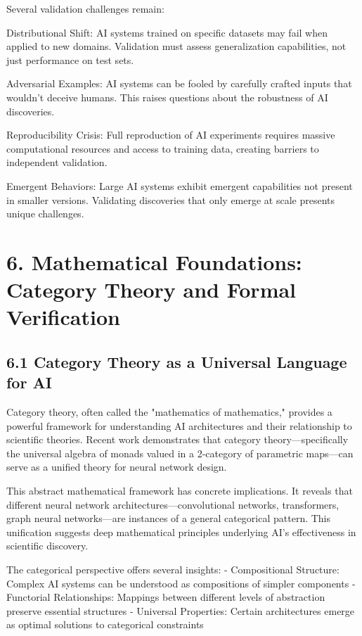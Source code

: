 \documentclass{article}
\begin{document}
Several validation challenges remain:


Distributional Shift: AI systems trained on specific datasets may fail when applied to new domains. Validation must assess generalization capabilities, not just performance on test sets.


Adversarial Examples: AI systems can be fooled by carefully crafted inputs that wouldn't deceive humans. This raises questions about the robustness of AI discoveries.


Reproducibility Crisis: Full reproduction of AI experiments requires massive computational resources and access to training data, creating barriers to independent validation.


Emergent Behaviors: Large AI systems exhibit emergent capabilities not present in smaller versions. Validating discoveries that only emerge at scale presents unique challenges.


\section{6. Mathematical Foundations: Category Theory and Formal Verification}

\subsection{6.1 Category Theory as a Universal Language for AI}

Category theory, often called the "mathematics of mathematics," provides a powerful framework for understanding AI architectures and their relationship to scientific theories. Recent work demonstrates that category theory—specifically the universal algebra of monads valued in a 2-category of parametric maps—can serve as a unified theory for neural network design.


This abstract mathematical framework has concrete implications. It reveals that different neural network architectures—convolutional networks, transformers, graph neural networks—are instances of a general categorical pattern. This unification suggests deep mathematical principles underlying AI's effectiveness in scientific discovery.


The categorical perspective offers several insights:
- Compositional Structure: Complex AI systems can be understood as compositions of simpler components
- Functorial Relationships: Mappings between different levels of abstraction preserve essential structures
- Universal Properties: Certain architectures emerge as optimal solutions to categorical constraints
\end{document}
